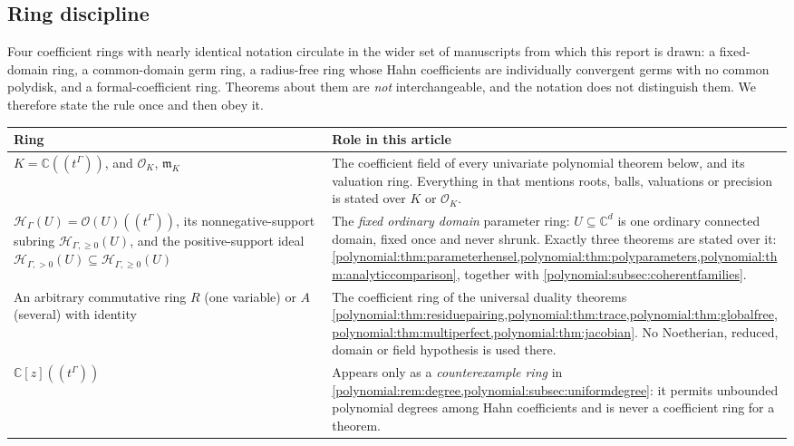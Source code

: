 \documentclass[11pt,letterpaper]{article}
\numberwithin{equation}{section}
\theoremstyle{definition}
\theoremstyle{remark}\newtheorem{remark}[theorem]{Remark}
\newcommand{\C}{\mathbb C}
\newcommand{\OO}{\mathcal O}
\newcommand{\mm}{\mathfrak m}
\newcommand{\HH}{\mathscr H_\Gamma}
\newcommand{\HHp}{\mathscr H_{\Gamma,>0}}
\newcommand{\HHn}{\mathscr H_{\Gamma,\ge0}}
\begin{document}
\subsection{Ring discipline}\label{polynomial:subsec:rings}
Four coefficient rings with nearly identical notation circulate in the wider
set of manuscripts from which this report is drawn: a fixed-domain ring, a
common-domain germ ring, a radius-free ring whose Hahn coefficients are
individually convergent germs with no common polydisk, and a
formal-coefficient ring. Theorems about them are \emph{not}
interchangeable, and the notation does not distinguish them. We therefore
state the rule once and then obey it.

\begin{center}
\begin{tabularx}{\textwidth}{@{}P{0.30\textwidth}L@{}}
\toprule
Ring & Role in this article\\
\midrule
$K=\C((t^\Gamma))$, and $\OO_K$, $\mm_K$ & The coefficient field of every
univariate polynomial theorem below, and its valuation ring. Everything in
 that
mentions roots, balls, valuations or precision is stated over $K$ or
$\OO_K$.\\[0.5em]
$\HH(U)=\OO(U)((t^\Gamma))$, its nonnegative-support subring $\HHn(U)$,
and the positive-support ideal $\HHp(U)\subseteq\HHn(U)$ &
The \emph{fixed ordinary domain} parameter ring: $U\subseteq\C^d$ is one
ordinary connected domain, fixed once and never shrunk. Exactly three
theorems are stated over it:
\cref{polynomial:thm:parameterhensel,polynomial:thm:polyparameters,polynomial:thm:analyticcomparison},
together with \cref{polynomial:subsec:coherentfamilies}.\\[0.5em]
An arbitrary commutative ring $R$ (one variable) or $A$ (several) with
identity & The coefficient ring of the universal duality theorems
\cref{polynomial:thm:residuepairing,polynomial:thm:trace,polynomial:thm:globalfree,polynomial:thm:multiperfect,polynomial:thm:jacobian}.
No Noetherian, reduced, domain or field hypothesis is used there.\\[0.5em]
$\C[z]((t^\Gamma))$ & Appears only as a \emph{counterexample ring} in
\cref{polynomial:rem:degree,polynomial:subsec:uniformdegree}: it permits
unbounded polynomial degrees among Hahn coefficients and is never a
coefficient ring for a theorem.\\
\bottomrule
\end{tabularx}
\end{center}
\end{document}
